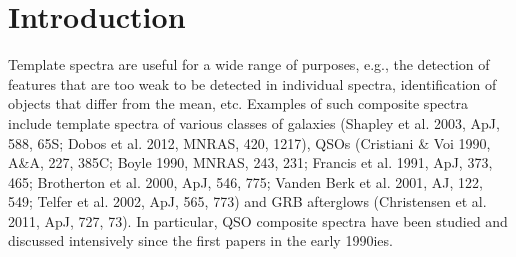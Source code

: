\documentclass[iop]{emulateapj}
\begin{document}




\section{Introduction}

Template spectra are useful for a wide range of purposes, e.g., the detection of features that are too weak to be detected in individual spectra, identification of objects that differ from the mean, etc. Examples of such composite spectra include template spectra of various classes of galaxies (Shapley et al. 2003, ApJ, 588, 65S; Dobos et al. 2012, MNRAS, 420, 1217), QSOs (Cristiani \& Voi 1990, A\&A, 227, 385C; Boyle 1990, MNRAS, 243, 231; Francis et al. 1991, ApJ, 373, 465; Brotherton et al. 2000, ApJ, 546, 775; Vanden Berk et al. 2001, AJ, 122, 549; Telfer et al. 2002, ApJ, 565, 773) and GRB afterglows (Christensen et al. 2011, ApJ, 727, 73). In particular, QSO composite spectra have been studied and discussed intensively since the first papers in the early 1990ies.

\newpage
\end{document}
